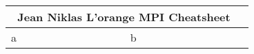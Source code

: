 \documentclass[10pt,a4paper]{article}
\begin{document}
\begin{tabularx}{\textwidth}{|X|X|} \hline
  \multicolumn{2}{|c|}{\bf ~Jean Niklas L'orange \hfill MPI Cheatsheet~~}%
  \\ \hline
  a & b
  \\ \hline
\end{tabularx}
\end{document}
